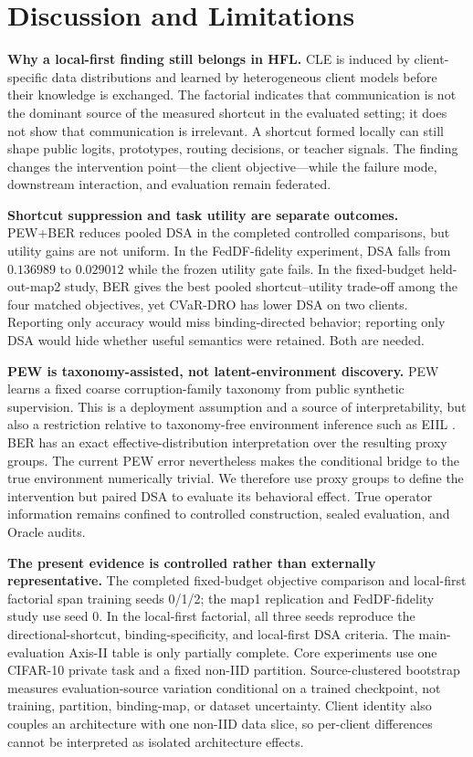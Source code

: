 \section{Discussion and Limitations}

\textbf{Why a local-first finding still belongs in HFL.}
CLE is induced by client-specific data distributions and learned by heterogeneous client models before their knowledge is exchanged. The factorial indicates that communication is not the dominant source of the measured shortcut in the evaluated setting; it does not show that communication is irrelevant. A shortcut formed locally can still shape public logits, prototypes, routing decisions, or teacher signals. The finding changes the intervention point---the client objective---while the failure mode, downstream interaction, and evaluation remain federated.

\textbf{Shortcut suppression and task utility are separate outcomes.}
PEW+BER reduces pooled DSA in the completed controlled comparisons, but utility gains are not uniform. In the FedDF-fidelity experiment, DSA falls from \(0.136989\) to \(0.029012\) while the frozen utility gate fails. In the fixed-budget held-out-map2 study, BER gives the best pooled shortcut--utility trade-off among the four matched objectives, yet CVaR-DRO has lower DSA on two clients. Reporting only accuracy would miss binding-directed behavior; reporting only DSA would hide whether useful semantics were retained. Both are needed.

\textbf{PEW is taxonomy-assisted, not latent-environment discovery.}
PEW learns a fixed coarse corruption-family taxonomy from public synthetic supervision. This is a deployment assumption and a source of interpretability, but also a restriction relative to taxonomy-free environment inference such as EIIL \citep{creager2021eiil}. BER has an exact effective-distribution interpretation over the resulting proxy groups. The current PEW error nevertheless makes the conditional bridge to the true environment numerically trivial. We therefore use proxy groups to define the intervention but paired DSA to evaluate its behavioral effect. True operator information remains confined to controlled construction, sealed evaluation, and Oracle audits.

\textbf{The present evidence is controlled rather than externally representative.}
The completed fixed-budget objective comparison and local-first factorial span training seeds 0/1/2; the map1 replication and FedDF-fidelity study use seed 0. In the local-first factorial, all three seeds reproduce the directional-shortcut, binding-specificity, and local-first DSA criteria. The main-evaluation Axis-II table is only partially complete. Core experiments use one CIFAR-10 private task and a fixed non-IID partition. Source-clustered bootstrap measures evaluation-source variation conditional on a trained checkpoint, not training, partition, binding-map, or dataset uncertainty. Client identity also couples an architecture with one non-IID data slice, so per-client differences cannot be interpreted as isolated architecture effects.

